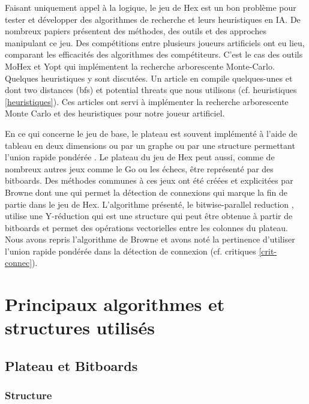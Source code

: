 \documentclass[12pt]{article}
\begin{document}
Faisant uniquement appel à la logique, le jeu de Hex est un bon problème pour tester et développer des algorithmes de recherche et leurs heuristiques en IA. De nombreux papiers présentent des méthodes, des outils et des approches manipulant ce jeu. Des compétitions entre plusieurs joueurs artificiels ont eu lieu, comparant les efficacités des algorithmes des compétiteurs. C'est le cas des outils MoHex \cite{AHH10} et Yopt \cite{DBLP:journals/ria/CazenaveS09} qui implémentent la recherche arborescente Monte-Carlo. Quelques heuristiques y sont discutées. Un article en compile quelques-unes \cite{RJ02} et \cite{RJ00} dont two distances (bfs) et potential threats que nous utilisons (cf. heuristiques \ref{heuristiques}). Ces articles ont servi à implémenter la recherche arborescente Monte Carlo et des heuristiques pour notre joueur artificiel.

\bigskip
En ce qui concerne le jeu de base, le plateau est souvent implémenté à l'aide de tableau en deux dimensions \cite{playhex} ou par un graphe \cite{JAhex} ou par une structure permettant l'union rapide pondérée \cite{Abdo}. Le plateau du jeu de Hex peut aussi, comme de nombreux autres jeux comme le Go ou les échecs, être représenté par des bitboards. Des méthodes communes à ces jeux ont été créées et explicitées par Browne \cite{browne14} dont une qui permet la détection de connexions qui marque la fin de partie dans le jeu de Hex. L'algorithme présenté, le bitwise-parallel reduction \cite{browne12}, utilise une Y-réduction qui est une structure qui peut être obtenue à partir de bitboards et permet des opérations vectorielles entre les colonnes du plateau. Nous avons repris l'algorithme de Browne \cite{browne12} et avons noté la pertinence d'utiliser l'union rapide pondérée dans la détection de connexion (cf. critiques \ref{crit-connec}).

\newpage
\section{Principaux algorithmes et structures utilisés}

\subsection{Plateau et Bitboards}

\subsubsection{Structure}
\end{document}
